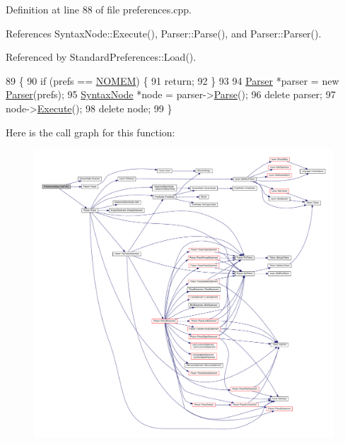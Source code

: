 Definition at line 88 of file preferences.\+cpp.



References Syntax\+Node\+::\+Execute(), Parser\+::\+Parse(), and Parser\+::\+Parser().



Referenced by Standard\+Preferences\+::\+Load().


\begin{DoxyCode}
89 \{
90     \textcolor{keywordflow}{if} (prefs == \hyperlink{platform_8h_a46ff2bfbf0d44b8466a2251d5bd5e6f8}{NOMEM}) \{
91         \textcolor{keywordflow}{return};
92     \}
93 
94     \hyperlink{classParser}{Parser} *parser = \textcolor{keyword}{new} \hyperlink{classParser}{Parser}(prefs);
95     \hyperlink{classSyntaxNode}{SyntaxNode} *node = parser->\hyperlink{classParser_a1861d1d9cc6165970cf07e07cacd11df}{Parse}();
96     \textcolor{keyword}{delete} parser;
97     node->\hyperlink{classSyntaxNode_ad8418608fa224536b48a590c87f0a509}{Execute}();
98     \textcolor{keyword}{delete} node;
99 \}
\end{DoxyCode}


Here is the call graph for this function\+:
\nopagebreak
\begin{figure}[H]
\begin{center}
\leavevmode
\includegraphics[width=350pt]{da/de5/classPreferencesBase_a90dcd05552f94429b05df661eb72b5e2_cgraph}
\end{center}
\end{figure}




